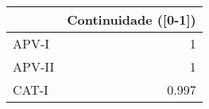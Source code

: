 \begin{tabular}{lr}
\hline
        &   Continuidade ([0-1]) \\
\hline
 APV-I  &                  1     \\
 APV-II &                  1     \\
 CAT-I  &                  0.997 \\
\hline
\end{tabular}